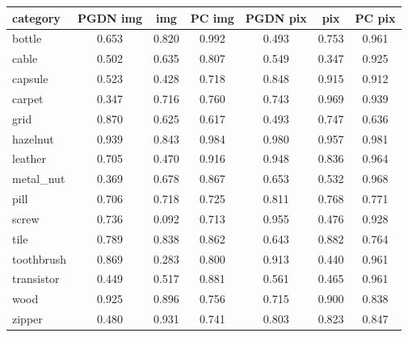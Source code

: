 \setlength{\tabcolsep}{3pt}
\begin{tabular}{@{}lcccccc@{}}
\toprule
category & PGDN img & \draem{} img & PC img & PGDN pix & \draem{} pix & PC pix \\
\midrule
bottle & 0.653 & 0.820 & 0.992 & 0.493 & 0.753 & 0.961 \\
cable & 0.502 & 0.635 & 0.807 & 0.549 & 0.347 & 0.925 \\
capsule & 0.523 & 0.428 & 0.718 & 0.848 & 0.915 & 0.912 \\
carpet & 0.347 & 0.716 & 0.760 & 0.743 & 0.969 & 0.939 \\
grid & 0.870 & 0.625 & 0.617 & 0.493 & 0.747 & 0.636 \\
hazelnut & 0.939 & 0.843 & 0.984 & 0.980 & 0.957 & 0.981 \\
leather & 0.705 & 0.470 & 0.916 & 0.948 & 0.836 & 0.964 \\
metal\_nut & 0.369 & 0.678 & 0.867 & 0.653 & 0.532 & 0.968 \\
pill & 0.706 & 0.718 & 0.725 & 0.811 & 0.768 & 0.771 \\
screw & 0.736 & 0.092 & 0.713 & 0.955 & 0.476 & 0.928 \\
tile & 0.789 & 0.838 & 0.862 & 0.643 & 0.882 & 0.764 \\
toothbrush & 0.869 & 0.283 & 0.800 & 0.913 & 0.440 & 0.961 \\
transistor & 0.449 & 0.517 & 0.881 & 0.561 & 0.465 & 0.961 \\
wood & 0.925 & 0.896 & 0.756 & 0.715 & 0.900 & 0.838 \\
zipper & 0.480 & 0.931 & 0.741 & 0.803 & 0.823 & 0.847 \\
\bottomrule
\end{tabular}
